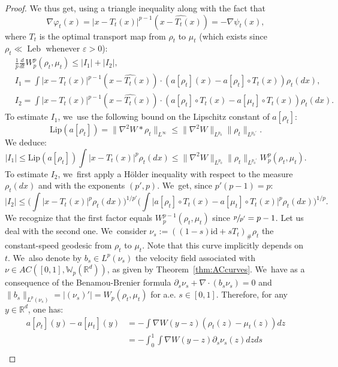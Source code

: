 \documentclass[JEP,XML,SOM,Unicode, NoFloatCountersInSection,published]{cedram}
\DeclareMathOperator{\Leb}{Leb}
\def\RR{\mathbb{R}}
\def\WW{\mathbb{W}}
\def\eps{\varepsilon}
\def\pa{\partial}
\def\lip{\mathrm{Lip}}
\theoremstyle{plain}
\theoremstyle{definition}
\begin{document}
\begin{proof}
We thus get, using a triangle inequality along with the fact that
\[
\nabla \varphi_t(x) = |x - T_t(x)|^{p-1} (\widehat{x - T_t(x)}) = - \nabla \psi_t(x),
\]
where $T_t$ is the optimal transport map from $\rho_t$ to $\mu_t$ (which exists since $\rho_t \ll \Leb$ whenever $\eps>0$):
\begin{subequations}\label{eq:I12}
\begin{align}
	& \frac 1p \frac{d}{dt} W_p^p(\rho_t, \mu_t) \leq |I_1| + |I_2|, \\
& I_1 = \int |x - T_t(x)|^{p-1} (\widehat{x - T_t(x)}) \cdot (a[\rho_t](x) - a[\rho_t] \circ T_t(x)) \rho_t(dx), \label{eq:I1} \\
& I_2 = \int |x - T_t(x)|^{p-1} (\widehat{x - T_t(x)}) \cdot (a[\rho_t] \circ T_t(x) - a[\mu_t] \circ T_t(x)) \rho_t(dx). \label{eq:I2}
\end{align}
\end{subequations}
To estimate $I_1$, we~use the following bound on the Lipschitz constant of $a[\rho_t]$:
\[
\lip (a[\rho_t]) = \|\nabla^2 W * \rho_t\|_{L^\infty} \leq \|\nabla^2 W\|_{L^{p_0}} \|\rho_t\|_{L^{p_0'}}.
\]
We deduce:
\[
|I_1| \leq \lip (a[\rho_t]) \int |x - T_t(x)|^p \rho_t(dx) \leq \|\nabla^2 W\|_{L^{p_0}} \|\rho_t\|_{L^{p_0'}} W_p^p(\rho_t, \mu_t).
\]
To estimate $I_2$, we~first apply a Hölder inequality with respect to the measure $\rho_t(dx)$ and with the exponents $(p',p)$. We~get, since $p'(p-1)=p$:
\begin{equation}\label{ineq:I2}
|I_2| \leq \bigg( \int |x - T_t(x)|^p \rho_t(dx) \bigg)^{1/p'} \bigg( \int \big|a[\rho_t] \circ T_t(x) - a[\mu_t] \circ T_t(x) \big|^p \rho_t(dx)\bigg)^{1/p}.
\end{equation}
We recognize that the first factor equals $W_p^{p-1}(\rho_t, \mu_t)$ since $\sfrac{p}{p'} = p-1$.
Let us deal with the second one. We~consider $\nu_s := \left((1-s)\text{id} + sT_t\right)_\#\rho_t$ the constant-speed geodesic from $\rho_t$ to $\mu_t$. Note that this curve implicitly depends on $t$. We~also denote by $b_s \in L^p(\nu_s)$ the velocity field associated with $\nu \in AC([0,1], \WW_p(\RR^d))$, as given by Theorem~\ref{thm:ACcurves}. We~have as a consequence of the Benamou-Brenier formula $\pa_s \nu_s + \nabla \cdot(b_s\nu_s) = 0$ and $\|b_s\|_{L^p(\nu_s)} = |(\nu_s)'| = W_p(\rho_t, \mu_t)$ for a.e. $s \in [0,1]$. Therefore, for any $y \in \RR^d$, one has:
\begin{align*}
a[\rho_t](y) - a[\mu_t](y) & = - \int \nabla W(y-z) (\rho_t(z) - \mu_t(z)) dz \\
& = - \int_0^1 \int \nabla W(y-z) \pa_s \nu_s(z) dz ds \\

\end{align*}
\end{proof}
\end{document}

